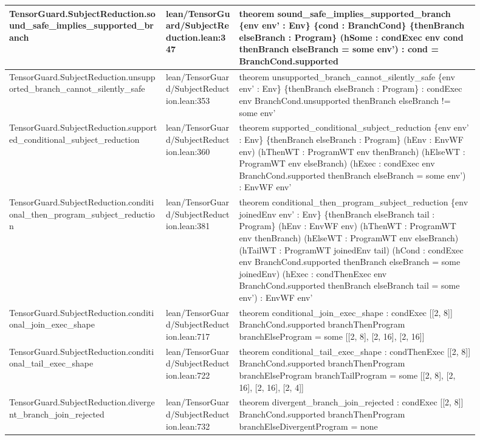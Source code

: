 \documentclass[10pt]{article}
\begin{document}
\begin{longtable}{|p{0.30\linewidth}|p{0.14\linewidth}|p{0.46\linewidth}|}
\hline
TensorGuard.SubjectReduction.sound\_safe\_implies\_supported\_branch & lean/TensorGuard/SubjectReduction.lean:347 & theorem sound\_safe\_implies\_supported\_branch \{env env' : Env\} \{cond : BranchCond\} \{thenBranch elseBranch : Program\} (hSome : condExec env cond thenBranch elseBranch = some env') : cond = BranchCond.supported \\
\hline
TensorGuard.SubjectReduction.unsupported\_branch\_cannot\_silently\_safe & lean/TensorGuard/SubjectReduction.lean:353 & theorem unsupported\_branch\_cannot\_silently\_safe \{env env' : Env\} \{thenBranch elseBranch : Program\} : condExec env BranchCond.unsupported thenBranch elseBranch != some env' \\
\hline
TensorGuard.SubjectReduction.supported\_conditional\_subject\_reduction & lean/TensorGuard/SubjectReduction.lean:360 & theorem supported\_conditional\_subject\_reduction \{env env' : Env\} \{thenBranch elseBranch : Program\} (hEnv : EnvWF env) (hThenWT : ProgramWT env thenBranch) (hElseWT : ProgramWT env elseBranch) (hExec : condExec env BranchCond.supported thenBranch elseBranch = some env') : EnvWF env' \\
\hline
TensorGuard.SubjectReduction.conditional\_then\_program\_subject\_reduction & lean/TensorGuard/SubjectReduction.lean:381 & theorem conditional\_then\_program\_subject\_reduction \{env joinedEnv env' : Env\} \{thenBranch elseBranch tail : Program\} (hEnv : EnvWF env) (hThenWT : ProgramWT env thenBranch) (hElseWT : ProgramWT env elseBranch) (hTailWT : ProgramWT joinedEnv tail) (hCond : condExec env BranchCond.supported thenBranch elseBranch = some joinedEnv) (hExec : condThenExec env BranchCond.supported thenBranch elseBranch tail = some env') : EnvWF env' \\
\hline
TensorGuard.SubjectReduction.conditional\_join\_exec\_shape & lean/TensorGuard/SubjectReduction.lean:717 & theorem conditional\_join\_exec\_shape : condExec [[2, 8]] BranchCond.supported branchThenProgram branchElseProgram = some [[2, 8], [2, 16], [2, 16]] \\
\hline
TensorGuard.SubjectReduction.conditional\_tail\_exec\_shape & lean/TensorGuard/SubjectReduction.lean:722 & theorem conditional\_tail\_exec\_shape : condThenExec [[2, 8]] BranchCond.supported branchThenProgram branchElseProgram branchTailProgram = some [[2, 8], [2, 16], [2, 16], [2, 4]] \\
\hline
TensorGuard.SubjectReduction.divergent\_branch\_join\_rejected & lean/TensorGuard/SubjectReduction.lean:732 & theorem divergent\_branch\_join\_rejected : condExec [[2, 8]] BranchCond.supported branchThenProgram branchElseDivergentProgram = none \\

\end{longtable}
\end{document}
